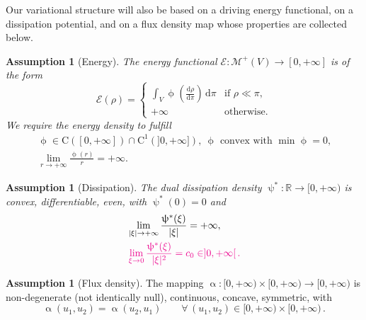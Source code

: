 \documentclass[11pt,reqno]{amsart}
\numberwithin{equation}{section}
\newcommand{\R}{\mathbb{R}}
\newcommand{\dd}{\mathrm{d}}
\theoremstyle{definition}
\newtheorem{assumption}[theorem]{Assumption}
\def\dd{\mathrm{d}}
\newcommand{\scrE}{\mathscr{E}}
\newcommand{\RCR}{\color{magenta}}
\newcommand{\EEE}{\color{black}}
\numberwithin{equation}{section}
\begin{document}
Our variational structure  will also be  based on a driving energy functional, on a dissipation potential, and on a flux density map whose properties are collected below.
\begin{assumption}[Energy]
\label{Ass:E} 
\sl
The energy functional
$\scrE: \mathcal{M}^+(V) \to [0,+\infty]$  is of the form
\[
\scrE(\rho) = \begin{cases}
\displaystyle \int_V \upphi\left(\frac{\dd\rho}{\dd \pi} \right)\, \dd \pi & \text{if } \rho \ll \pi,
\\
+\infty  & \text{otherwise.}
\end{cases}
\]
We require the energy density to fulfill
\begin{equation}
\label{ass-phi}
\begin{gathered}
\upphi \in \mathrm{C}([0,+\infty] ) \cap \mathrm{C}^1(]0,+\infty] ), \  \text{$\upphi$ convex with  $\min \upphi =0$,}
\\
\lim_{r\to+\infty}  \frac{\upphi(r)}{r} =+\infty.
\end{gathered}
\end{equation}
\end{assumption}
\begin{assumption}[Dissipation]
\label{Ass:D}
\sl
The dual dissipation density $\uppsi^*:\R \to [0,+\infty)$ is convex, differentiable, even, with $\uppsi^*(0)=0$ and 
\begin{align}
\label{growth-psistar}
&
 \lim_{|\xi|\to+\infty} \frac{\uppsi^*(\xi)}{|\xi|} =+\infty,
\\
&
 \label{quadratic-at-0}
\RCR \lim_{\xi \to 0} \frac{\uppsi^*(\xi)}{|\xi|^2} =c_0 \in ]0,+\infty[\,. \EEE
 \end{align}
 \end{assumption}
%
\begin{assumption}[Flux density]
\label{Ass:flux-density}
The  mapping $\upalpha: [0,+\infty)\times [0,+\infty) \to [0,+\infty)$ is non-degenerate (not identically null),
 continuous, concave, symmetric, with 
\begin{equation}
\label{props-alpha}
\upalpha(u_1,u_2) = \upalpha(u_2,u_1) \qquad\forall\, (u_1,u_2) \in  [0,+\infty)\times [0,+\infty)\,.
\end{equation}
\end{assumption}
\end{document}
